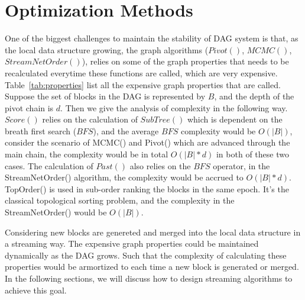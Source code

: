 \section{Optimization Methods}
One of the biggest challenges to maintain the stability of DAG system is that, 
as the local data structure growing, the graph algorithms ($Pivot()$, $MCMC()$, $StreamNetOrder()$), 
relies on some of the graph properties that needs to be recalculated everytime these functions are called,
which are very expensive. 
Table~\ref{tab:properties} list all the expensive graph properties that are called. 
Suppose the set of blocks in the DAG is represented by $B$, and the depth of the pivot chain is $d$.
Then we give the analysis of complexity in the following way. 
$Score()$ relies on the calculation of $SubTree()$ which is dependent on the breath first search ($BFS$), and the average $BFS$
complexity would be $O(|B|)$, consider the scenario of MCMC() and Pivot() which are advanced through the main chain,
the complexity would be in total $O(|B|*d)$ in both of these two cases.
The calculation of $Past()$ also relies on the $BFS$ operator, in the StreamNetOrder() algorithm, the complexity would be 
accrued to $O(|B| * d)$.
TopOrder() is used in sub-order ranking the blocks in the same epoch.
It's the classical topological sorting problem, and the complexity in the StreamNetOrder() would be $O(|B|)$.

\begin{table}[]
\caption {Analysis of Graph properties calculation} \label{tab:properties}
\begin{center}
\end{center}
\end{table}

Considering new blocks are genereted and merged into the local data structure in a streaming way.
The expensive graph properties could be maintained dynamically as the DAG grows.
Such that the complexity of calculating these properties would be armortized to each time a new block is generated or merged.
In the following sections, we will discuss how to design streaming algorithms to achieve this goal.

